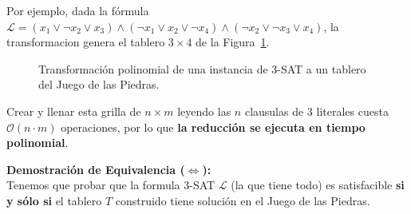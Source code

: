Por ejemplo, dada la fórmula $\mathcal{L} = (x_1 \lor \neg x_2 \lor x_3) \land (\neg x_1 \lor x_2 \lor \neg x_4) \land (\neg x_2 \lor \neg x_3 \lor x_4)$, la transformacion genera el tablero $3 \times 4$ de la Figura~\ref{fig:reduccion_3sat}.

\begin{figure}[H]
    \centering
    
    \renewcommand{\thefigure}{3}
    \caption{Transformación polinomial de una instancia de 3-SAT a un tablero del Juego de las Piedras.}
    \label{fig:reduccion_3sat}
\end{figure}

Crear y llenar esta grilla de $n \times m$ leyendo las $n$ clausulas de $3$ literales cuesta $\mathcal{O}(n \cdot m)$ operaciones, por lo que \textbf{la reducción se ejecuta en tiempo polinomial}.

\noindent\textbf{Demostración de Equivalencia ($\iff$):} \\
Tenemos que probar que la formula 3-SAT $\mathcal{L}$ (la que tiene todo) es satisfacible \textbf{si y sólo si} el tablero $T$ construido tiene solución en el Juego de las Piedras.

